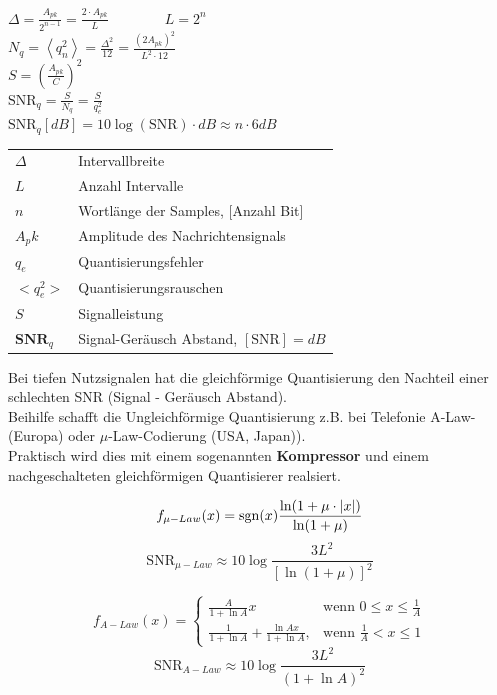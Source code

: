 \begin{multicols}{2}
	$ \Delta = \frac{A_{pk}}{2^{n-1}} = \frac{2 \cdot A_{pk}}{L} \qquad \qquad L =
	2^n$\\
	$ N_q = \left< q_n^2 \right> = \frac{\Delta^2}{12} =
	\frac{\left(2A_{pk}\right)^2}{L^2 \cdot 12}$\\
	$ S = \left( \frac{ A_{pk} }{C} \right)^2$\\
	$ \text{SNR}_{q} =\frac{S}{N_q}=\frac{S}{q_e^2}$\\
	$\text{SNR}_{q} \left[dB\right] =10 \log(\text{SNR}) \cdot dB \approx n \cdot
	6dB$
\columnbreak

	\begin{tabular}{>{\boldmath}ll}
		$\Delta$ & Intervallbreite \\
		$L$ & Anzahl Intervalle \\
		$n$ & Wortlänge der Samples, [Anzahl Bit] \\
		$A_pk$ & Amplitude des Nachrichtensignals \\
		$q_e$ & Quantisierungsfehler \\
		$<q_e^2>$ & Quantisierungsrauschen \\
		$S$ & Signalleistung\\
		$\textbf{SNR}_{q}$ & Signal-Geräusch Abstand, $[\text{SNR}] = dB$
	\end{tabular}
\end{multicols}


Bei tiefen Nutzsignalen hat die gleichförmige Quantisierung den Nachteil einer schlechten SNR
(Signal - Geräusch Abstand). \\
Beihilfe schafft die Ungleichförmige Quantisierung z.B. bei Telefonie
A-Law-(Europa) oder $\mu$-Law-Codierung (USA, Japan)). \\
Praktisch wird dies mit einem sogenannten \textbf{Kompressor} und einem nachgeschalteten
gleichförmigen Quantisierer realsiert.

\begin{minipage}{9cm}
$$ f_{\mu-Law}(x) = \operatorname{sgn}(x) \frac{\ln(1+\mu\cdot|x|)}{\ln(1+\mu)}$$
$$\text{SNR}_{\mu-Law} \approx 10 \log \dfrac{3 L^2}{[\ln(1 + \mu)]^2}$$
\end{minipage}
\begin{minipage}{9cm}
$$f_{A-Law}(x)=\begin{cases} \frac{A}{1+ \ln A} x & \mbox{wenn }0 \le x \le \frac{1}{A} \\
	\frac{1}{1+ \ln A} + \frac{\ln Ax}{1+ \ln A}, & \mbox{wenn } \frac{1}{A} < x \le 1 \end{cases} $$
$$\text{SNR}_{A-Law} \approx 10 \log \dfrac{3 L^2}{(1+\ln A)^2}$$
\end{minipage}


